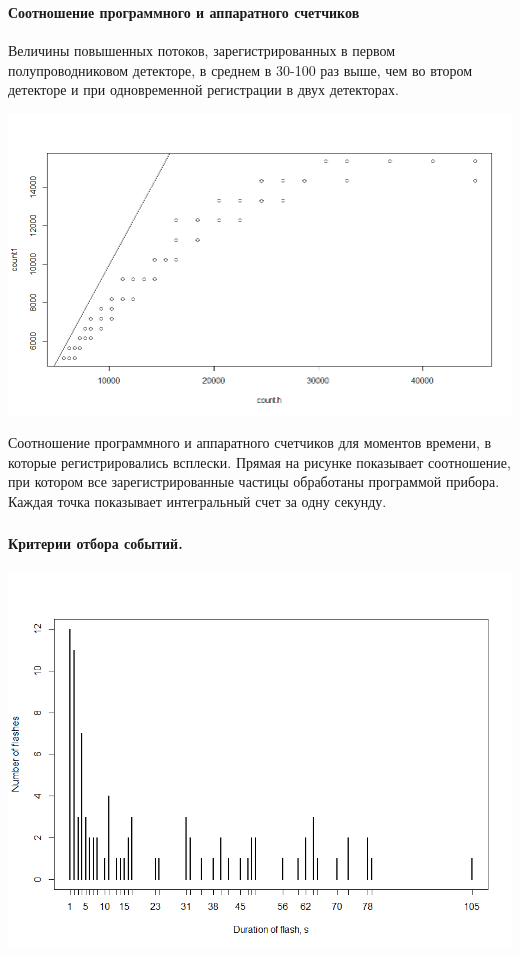 \documentclass[t, aspectratio=43]{beamer}
\begin{document}
\begin{frame}	
\frametitle{\insertsection} 
\framesubtitle{Соотношение программного и аппаратного счетчиков}
{\tiny Величины повышенных потоков, зарегистрированных в первом полупроводниковом детекторе, в среднем в 30-100 раз выше, чем во втором детекторе и при одновременной регистрации в двух детекторах.}

\centering
\includegraphics[width=0.7\linewidth]{images/Rplot04}


\tiny{Соотношение программного и аппаратного счетчиков для моментов времени, в которые регистрировались всплески. Прямая на рисунке показывает соотношение, при котором все зарегистрированные частицы обработаны программой прибора. Каждая точка показывает интегральный счет за одну секунду.}
\end{frame}
\begin{frame}	
\frametitle{\insertsection} 
\framesubtitle{Критерии отбора событий.}

\begin{center}
	\includegraphics[width=0.7\linewidth]{images/Rplot12}
\end{center}


\end{frame}
\end{document}
